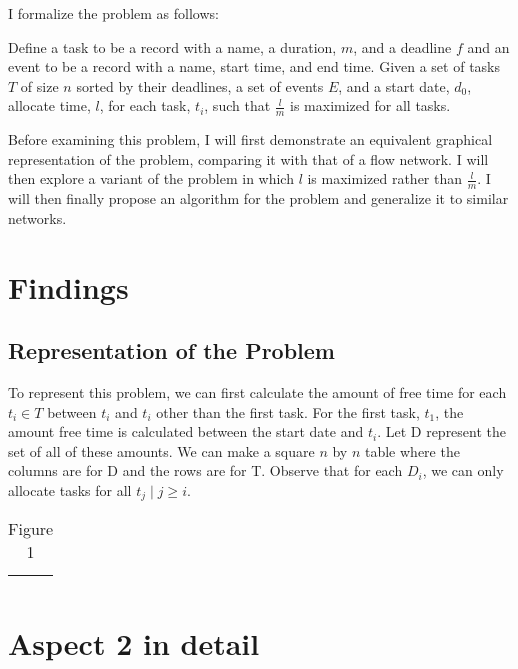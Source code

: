 \documentclass[11pt]{article}
\begin{document}
I formalize the problem as follows:
\begin{tcolorbox}
	Define a task to be a record with a name, a duration, $m$, and a deadline $f$ and an event to be a record with a name, start time, and end time. Given a set of tasks $T$ of size $n$ sorted by their deadlines, a set of events $E$, and a start date, $d_0$, allocate time, $l$, for each task, $t_i$, such that $\frac{l}{m}$ is maximized for all tasks. 
\end{tcolorbox}
Before examining this problem, I will first demonstrate an equivalent graphical representation of the problem, comparing it with that of a flow network. I will then explore a variant of the problem in which $l$ is maximized rather than  $\frac{l}{m}$. I will then finally propose an algorithm for the problem and generalize it to similar networks.
\section{Findings}
\subsection{Representation of the Problem}
To represent this problem, we can first calculate the amount of free time for each $t_i \in T$ between $t_i$ and $t_i$ other than the first task. For the first task, $t_1$, the amount free time is calculated between the start date and $t_i$. Let D represent the set of all of these amounts. We can make a square $n$ by $n$ table where the columns are for D and the rows are for T.  Observe that for each $D_i$, we can only allocate tasks for all $t_j \mid j \geq i$. 
\begin{center}
	\begin{table}
	\begin{tabular}{c c c c}
		\hline 
		\multicolumn{4}{|c|}{} \\ 
		\hline
	\end{tabular}
		\caption{Figure 1}
	\end{table}
	\end{center}
\section{Aspect 2 in detail}
\begin{center}
\end{center}
\end{document}
